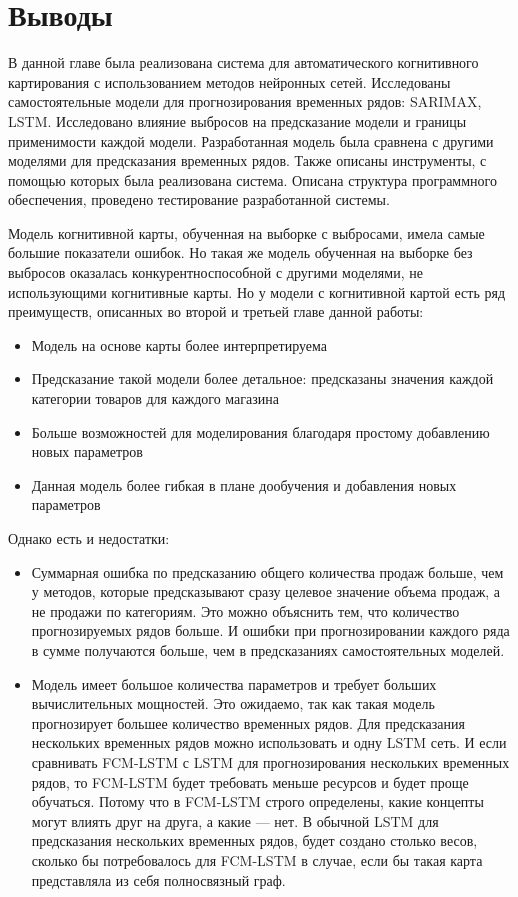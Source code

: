 \section{Выводы}

В данной главе была реализована система для автоматического когнитивного картирования с использованием
методов нейронных сетей. Исследованы самостоятельные модели для прогнозирования временных рядов:
SARIMAX, LSTM.
Исследовано влияние выбросов на предсказание модели и границы применимости каждой модели.
Разработанная модель была сравнена с другими моделями для предсказания временных рядов.
Также описаны инструменты, с помощью которых была реализована система.
Описана структура программного обеспечения, проведено тестирование разработанной системы.

Модель когнитивной карты, обученная на выборке с выбросами, имела самые большие показатели
ошибок. Но такая же модель обученная на выборке без выбросов
оказалась конкурентноспособной с другими моделями, не использующими
когнитивные карты. Но у модели с когнитивной картой есть ряд преимуществ,
описанных во второй и третьей главе данной работы:

\begin{itemize}
	\item Модель на основе карты более интерпретируема
	\item Предсказание такой модели более детальное: предсказаны значения каждой категории товаров для каждого магазина
	\item Больше возможностей для моделирования благодаря простому добавлению новых параметров
	\item Данная модель более гибкая в плане дообучения и добавления новых параметров
\end{itemize}

Однако есть и недостатки:
\begin{itemize}
	\item Суммарная ошибка по предсказанию общего количества продаж больше,
	чем у методов, которые предсказывают сразу целевое значение объема продаж,
	а не продажи по категориям. Это можно объяснить тем, что количество прогнозируемых рядов больше.
	И ошибки при прогнозировании каждого ряда в сумме получаются больше, чем в предсказаниях
	самостоятельных моделей.
	\item Модель имеет большое количества параметров и требует больших вычислительных мощностей.
	Это ожидаемо, так как такая модель прогнозирует большее количество временных рядов.
	Для предсказания нескольких временных рядов можно использовать и одну LSTM
	сеть. И если сравнивать FCM-LSTM с LSTM для прогнозирования нескольких временных рядов,
	то FCM-LSTM будет требовать меньше ресурсов и будет проще обучаться. Потому что
	в FCM-LSTM строго определены, какие концепты могут влиять друг на друга, а какие --- нет.
	В обычной LSTM для предсказания нескольких временных рядов, будет создано столько весов,
	сколько бы потребовалось для FCM-LSTM в случае, если бы такая карта представляла из себя
	полносвязный граф.
\end{itemize}


